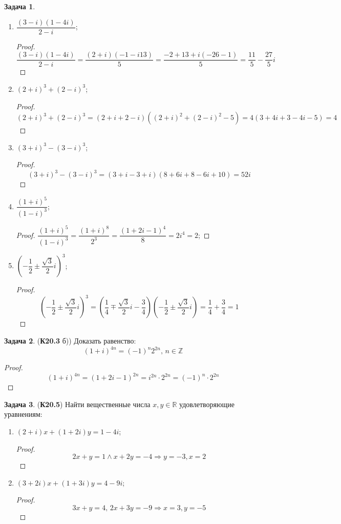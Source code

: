 \documentclass[12pt]{article}
\newcommand{\MR}{\mathbb{R}}
\newcommand{\MZ}{\mathbb{Z}}
\theoremstyle{definition}
\newtheorem{problem}{Задача}
\begin{document}
\begin{problem}
\begin{enumerate}[label=\asbuk*)]
	\newpage
		\item $\dfrac{(3-i)(1-4i)}{2 - i}$;
		\begin{proof}
			$$
				\dfrac{(3-i)(1-4i)}{2 - i} = \dfrac{(2 + i)(-1 - i13)}{5} = \dfrac{-2 + 13 + i(-26 -1)}{5} = \dfrac{11}{5} - \dfrac{27}{5}i
			$$
		\end{proof}
		\item $(2 + i)^3 + (2-i)^3$;
		\begin{proof}
			$$
				(2 + i)^3 + (2-i)^3 = (2+ i + 2- i)((2+i)^2 +(2-i)^2 - 5) = 4(3 + 4i + 3 -4i - 5) = 4
			$$
		\end{proof}
		\item $(3+i)^3 - (3-i)^3$;
		\begin{proof}
			$$
				(3+i)^3 - (3-i)^3 = (3 + i - 3 + i)(8 + 6i + 8 -6i  + 10) = 52i
			$$
		\end{proof}
		\item $\dfrac{(1+i)^5}{(1-i)^3}$;
		\begin{proof}
				$\dfrac{(1+i)^5}{(1-i)^3} = \dfrac{(1+i)^8}{2^3} = \dfrac{(1 + 2i - 1)^4}{8} = 2i^4 = 2$;		
		\end{proof}
		\item $\left(-\dfrac{1}{2} \pm \dfrac{\sqrt{3}}{2}i \right)^3$;
		\begin{proof}
			$$
				\left(-\dfrac{1}{2} \pm \dfrac{\sqrt{3}}{2}i \right)^3 = \left(\dfrac{1}{4} \mp\dfrac{\sqrt{3}}{2}i - \dfrac{3}{4} \right)\left(-\dfrac{1}{2} \pm\dfrac{\sqrt{3}}{2}i\right) = \dfrac{1}{4} + \dfrac{3}{4} = 1
			$$
		\end{proof}
	\end{enumerate}
\end{problem}	

\begin{problem}(\textbf{К20.3} б))
	Доказать равенство:
	$$
		(1 + i)^{4n} = (-1)^n2^{2n}, \, n\in \MZ
	$$
\end{problem}
\begin{proof}
	$$
		(1 + i)^{4n} = (1 + 2i - 1)^{2n} = i^{2n}{\cdot}2^{2n} = (-1)^n{\cdot}2^{2n}
	$$
\end{proof}

\begin{problem}(\textbf{К20.5})
	Найти вещественные числа $x,y\in\MR$ удовлетворяющие уравнениям:
	\begin{enumerate}[label=\asbuk*)]
		\item $(2 + i)x + (1 + 2i)y = 1- 4i$;
		\begin{proof}
			$$
				2x + y = 1 \wedge x + 2y = - 4 \Rightarrow y = - 3, x = 2
			$$
		\end{proof}
	\newpage
		\item $(3 + 2i)x + (1 + 3i)y = 4 - 9i$;
		\begin{proof}
			$$
				3x + y = 4, \, 2x + 3y = -9 \Rightarrow x = 3, y = -5
			$$
		\end{proof}
	\end{enumerate}
\end{problem}
\end{document}
